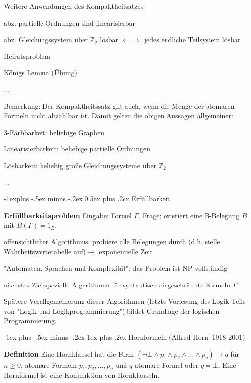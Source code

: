 \documentclass[a4paper]{article}
\makeatletter
\renewcommand{\note}[2]{\begin{noteBox} \textbf{#1} #2 \end{noteBox}}
\renewcommand{\subsection}{\@startsection{subsection}{2}{0mm}%
                {-1explus -.5ex minus -.2ex}%
                {0.5ex plus .2ex}%
                {\normalfont\normalsize\bfseries}}
\renewcommand{\subsubsection}{\@startsection{subsubsection}{3}{0mm}%
                {-1ex plus -.5ex minus -.2ex}%
                {1ex plus .2ex}%
                {\normalfont\small\bfseries}}
\makeatother
\begin{document}
\begin{multicols}{3}
  Weitere Anwendungen des Kompaktheitsatzes
  \begin{itemize*}
    \item abz. partielle Ordnungen sind linearisierbar
    \item abz. Gleichungssystem über $\mathbb{Z}_2$ lösbar $\Leftarrow\Rightarrow$ jedes endliche Teilsystem lösbar
    \item Heiratsproblem
    \item Kőnigs Lemma (Übung)
    \item ...
  \end{itemize*}

  Bemerkung: Der Kompaktheitssatz gilt auch, wenn die Menge der atomaren Formeln nicht abzählbar ist. Damit gelten die obigen Aussagen allgemeiner:
  \begin{itemize*}
    \item 3-Färbbarkeit: beliebige Graphen
    \item Linearisierbarkeit: beliebige partielle Ordnungen
    \item Lösbarkeit: beliebig große Gleichungssysteme über $\mathbb{Z}_2$
    \item ...
  \end{itemize*}


  \subsection{Erfüllbarkeit}
  \note{Erfüllbarkeitsproblem}{Eingabe: Formel $\Gamma$. Frage: existiert eine B-Belegung $B$ mit $B(\Gamma) = 1_B$.}

  \begin{itemize*}
    \item offensichtlicher Algorithmus: probiere alle Belegungen durch (d.h. stelle Wahrheitswertetabelle auf)$\rightarrow$ exponentielle Zeit
    \item "Automaten, Sprachen und Komplexität": das Problem ist NP-vollständig
    \item nächstes Ziel:spezielle Algorithmen für syntaktisch eingeschränkte Formeln $\Gamma$
    \item Spätere Verallgemeinerung dieser Algorithmen (letzte Vorlesung des Logik-Teils von "Logik und Logikprogrammierung") bildet Grundlage der logischen Programmierung.
  \end{itemize*}

  \subsubsection{Hornformeln (Alfred Horn, 1918-2001)}
  \note{Definition}{Eine Hornklausel hat die Form $(\lnot\bot\wedge p_1\wedge p_2\wedge ... \wedge p_n)\rightarrow q$ für $n\geq 0$, atomare Formeln $p_1 ,p_2 ,... ,p_n$ und $q$ atomare Formel oder $q=\bot$.
    Eine Hornformel ist eine Konjunktion von Hornklauseln.}


\end{multicols}
\end{document}
